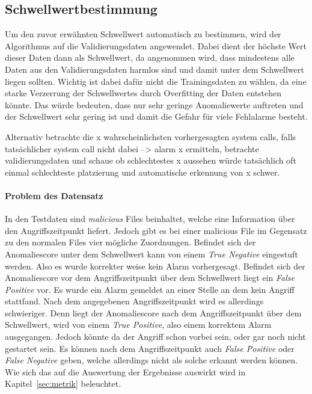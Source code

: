             \subsection{Schwellwertbestimmung}
            Um den zuvor erwähnten Schwellwert automatisch zu bestimmen, wird der Algorithmus auf die Validierungsdaten angewendet. 
            Dabei dient der höchste Wert dieser Daten dann als Schwellwert, da angenommen wird, dass mindestens alle Daten aus den Validierungsdaten harmlos sind und damit unter dem Schwellwert liegen sollten.
            Wichtig ist dabei dafür nicht die Trainingsdaten zu wählen, da eine starke Verzerrung der Schwellwertes durch Overfitting der Daten entstehen könnte. 
            Das würde bedeuten, dass nur sehr geringe Anomaliewerte auftreten und der Schwellwert sehr gering ist und damit die Gefahr für viele Fehlalarme besteht.

            Alternativ betrachte die x wahrscheinlichsten vorhergesagten system calls, falls tatsächlicher system call nicht dabei --> alarm
            x ermitteln, betrachte validierungsdaten und schaue ob schlechtestes x aussehen würde
            tatsächlich oft einmal schlechteste platzierung und automatische erkennung von x schwer.

            \paragraph{Problem des Datensatz}

                In den Testdaten sind \textit{malicious}  Files beinhaltet, welche eine Information über den Angriffszeitpunkt liefert. 
                Jedoch gibt es bei einer malicious File im Gegensatz zu den normalen Files  vier mögliche Zuordnungen.
                Befindet sich der Anomaliescore unter dem Schwellwert kann von einem \textit{True Negative} eingestuft werden.
                Also es wurde korrekter weise kein Alarm vorhergesagt.
                Befindet sich der Anomaliescore vor dem Angriffszeitpunkt über dem Schwellwert liegt ein \textit{False Positive} vor.
                Es wurde ein Alarm gemeldet an einer Stelle an dem kein Angriff stattfand.
                Nach dem angegebenen Angriffszeitpunkt wird es allerdings schwieriger.
                Denn liegt der Anomaliescore nach dem Angriffszeitpunkt über dem Schwellwert, wird von einem \textit{True Positive}, also einem korrektem Alarm ausgegangen.
                Jedoch könnte da der Angriff schon vorbei sein, oder gar noch nicht gestartet sein.
                Es können nach dem Angriffszeitpunkt auch \textit{False Positive} oder \textit{False Negative} geben, welche allerdings nicht als solche erkannt werden können.
                Wie sich das auf die Auswertung der Ergebnisse auswirkt wird in Kapitel~\ref{sec:metrik} beleuchtet.

